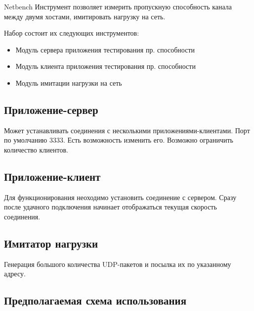 \documentclass[a4paper, 12pt]{article}
\begin{document}
Netbench
Инструмент позволяет измерить пропускную способность канала между двумя хостами, 
имитировать нагрузку на сеть.

Набор состоит их следующих инструментов:
\begin{itemize}
	\item Модуль сервера приложения тестирования пр. способности
	\item Модуль клиента приложения тестирования пр. способности
	\item Модуль имитации нагрузки на сеть
\end{itemize}

\subsection{Приложение-сервер}
Может устанавливать соединения с несколькими приложениями-клиентами.
Порт по умолчанию 3333. Есть возможность изменить его. 
Возможно ограничить количество клиентов.
\subsection{Приложение-клиент}
Для функционирования неоходимо установить соединение с сервером.
Сразу после удачного подключения начинает отображаться текущая скорость соединения.
\subsection{Имитатор нагрузки}
Генерация большого количества UDP-пакетов и посылка их по указанному адресу.
\subsection{Предполагаемая схема использования}
\end{document}
